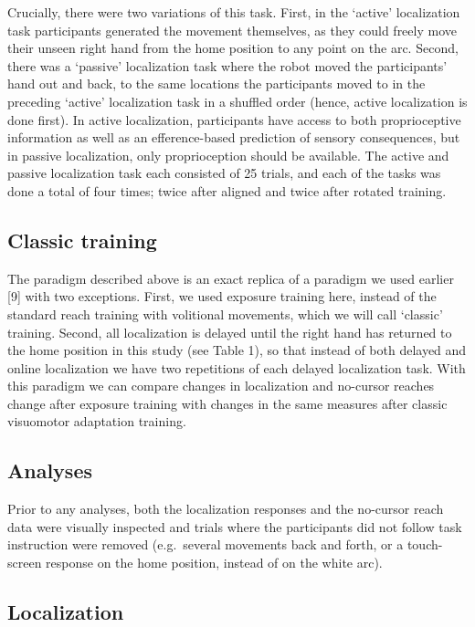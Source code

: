 \documentclass[10pt,letterpaper]{article}
\begin{document}
Crucially, there were two variations of this task. First, in the
`active' localization task participants generated the movement
themselves, as they could freely move their unseen right hand from the
home position to any point on the arc. Second, there was a `passive'
localization task where the robot moved the participants' hand out and
back, to the same locations the participants moved to in the preceding
`active' localization task in a shuffled order (hence, active
localization is done first). In active localization, participants have
access to both proprioceptive information as well as an efference-based
prediction of sensory consequences, but in passive localization, only
proprioception should be available. The active and passive localization
task each consisted of 25 trials, and each of the tasks was done a total
of four times; twice after aligned and twice after rotated training.

\subsection{Classic training}\label{classic-training}

The paradigm described above is an exact replica of a paradigm we used
earlier {[}9{]} with two exceptions. First, we used exposure training
here, instead of the standard reach training with volitional movements,
which we will call `classic' training. Second, all localization is
delayed until the right hand has returned to the home position in this
study (see Table 1), so that instead of both delayed and online
localization we have two repetitions of each delayed localization task.
With this paradigm we can compare changes in localization and no-cursor
reaches change after exposure training with changes in the same measures
after classic visuomotor adaptation training.

\subsection{Analyses}\label{analyses}

Prior to any analyses, both the localization responses and the no-cursor
reach data were visually inspected and trials where the participants did
not follow task instruction were removed (e.g.~several movements back
and forth, or a touch-screen response on the home position, instead of
on the white arc).

\subsection{Localization}\label{localization-1}
\end{document}
